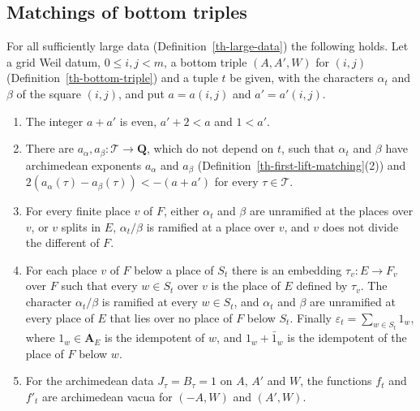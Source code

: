 \subsection{Matchings of bottom triples}\label{subsection-th-bottom-matchings}

\begin{lemma}\label{th-bottom-square-facts}
For all sufficiently large data (Definition~\ref{th-large-data}) the following
holds. Let a grid Weil datum, $0\leq i,j<m$, a bottom triple $(A,A',W)$ for
$(i,j)$ (Definition~\ref{th-bottom-triple}) and a tuple $t$ be given, with the
characters $\alpha_t$ and $\beta$ of the square $(i,j)$, and put $a=a(i,j)$
and $a'=a'(i,j)$.
\begin{enumerate}
\item The integer $a+a'$ is even, $a'+2<a$ and $1<a'$.
\item There are $a_\alpha,a_\beta\colon\mathcal T\to\mathbf Q$, which do not
  depend on $t$, such that $\alpha_t$ and $\beta$ have archimedean exponents
  $a_\alpha$ and $a_\beta$ (Definition~\ref{th-first-lift-matching}(2)) and
  $2(a_\alpha(\tau)-a_\beta(\tau))<-(a+a')$ for every $\tau\in\mathcal T$.
\item For every finite place $v$ of $F$, either $\alpha_t$ and $\beta$ are
  unramified at the places over $v$, or $v$ splits in $E$, $\alpha_t/\beta$ is
  ramified at a place over $v$, and $v$ does not divide the different of $F$.
\item For each place $v$ of $F$ below a place of $S_t$ there is an embedding
  $\tau_v\colon E\to F_v$ over $F$ such that every $w\in S_t$ over $v$ is the
  place of $E$ defined by $\tau_v$. The character $\alpha_t/\beta$ is ramified
  at every $w\in S_t$, and $\alpha_t$ and $\beta$ are unramified at every
  place of $E$ that lies over no place of $F$ below $S_t$. Finally
  $\varepsilon_t=\sum_{w\in S_t}1_w$, where $1_w\in\mathbf A_E$ is the
  idempotent of $w$, and $1_w+\bar{1}_w$ is the idempotent of the place of $F$
  below $w$.
\item For the archimedean data $J_\tau=B_\tau=1$ on $A$, $A'$ and $W$, the
  functions $f_t$ and $f'_t$ are archimedean vacua for $(-A,W)$ and $(A',W)$.
\end{enumerate}
\end{lemma}
